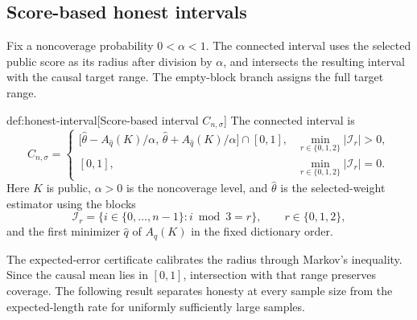 \subsection{Score-based honest intervals}

Fix a noncoverage probability \(0<\alpha<1\). The connected interval  uses the selected public score as its radius after division by \(\alpha\), and intersects the resulting interval with the causal target range. The empty-block branch assigns the full target range.

\begin{definitionv}{def:honest-interval}[Score-based interval \(C_{n,\sigma}\)]
The connected interval is
\[
C_{n,\sigma}
=
\begin{cases}
\bigl[\widehat\theta-A_{\widehat q}(K)/\alpha,\,
      \widehat\theta+A_{\widehat q}(K)/\alpha\bigr]\cap[0,1],
      &\min_{r\in\{0,1,2\}}|\mathcal I_r|>0,\\
[0,1],&\min_{r\in\{0,1,2\}}|\mathcal I_r|=0.
\end{cases}
\]
Here \(K\) is public, \(\alpha>0\) is the noncoverage level, and \(\widehat\theta\) is the selected-weight estimator using the blocks
\[
\mathcal I_r
=\{i\in\{0,\ldots,n-1\}:i\bmod 3=r\},
\qquad r\in\{0,1,2\},
\]
and the first minimizer \(\widehat q\) of \(A_q(K)\) in the fixed dictionary order.
\end{definitionv}

The expected-error certificate calibrates the radius through Markov's inequality. Since the causal mean lies in \([0,1]\), intersection with that range preserves coverage. The following result separates honesty at every sample size from the expected-length rate for uniformly sufficiently large samples.


